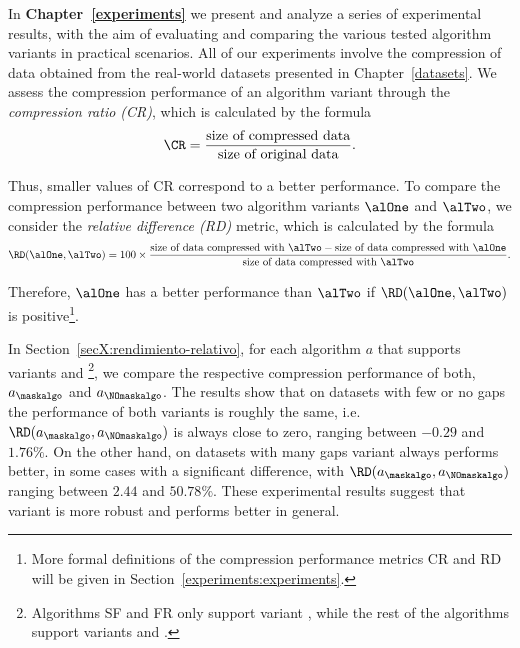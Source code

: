 In \textbf{Chapter~\ref{experiments}} we present and analyze a series of experimental results, with the aim of evaluating and comparing the various tested algorithm variants in practical scenarios. All of our experiments involve the compression of data obtained from the real-world datasets presented in Chapter~\ref{datasets}. We assess the compression performance of an algorithm variant through the \textit{compression ratio (CR)}, which is calculated by the formula
\vspace{-2pt}
\begin{equation}
\CR = \frac{\textnormal{size of compressed data}}{\textnormal{size of original data}}.
\end{equation}


\clearpage


\newcommand{\footCRRD}{\footnote{More formal definitions of the compression performance metrics CR and RD will be given in Section~\ref{experiments:experiments}.}}

Thus, smaller values of CR correspond to a better performance. To compare the compression performance between two algorithm variants $\alOne$ and $\alTwo$, we consider the \textit{relative difference (RD)} metric, which is calculated by the formula
\vspace{-2pt}
\newcommand{\sizeofd}{\textnormal{size of data compressed with }}
\begin{equation}
\RD(\alOne, \alTwo) = 100\times\frac{\sizeofd \alTwo - \sizeofd \alOne}{\sizeofd \alTwo}.
\end{equation}

\vspace{-2pt}
Therefore, $\alOne$ has a better performance than $\alTwo$ if $\RD(\alOne, \alTwo)$ is positive\footCRRD.


\newcommand{\footSupportBoth}{\footnote{Algorithms SF and FR only support variant \maskalgo, while the rest of the algorithms support variants \maskalgo and \NOmaskalgo.}}


In Section~\ref{secX:rendimiento-relativo}, for each algorithm $a$ that supports variants \maskalgo and \NOmaskalgo\footSupportBoth, we compare the respective compression performance of both, $a_\maskalgo$ and $a_\NOmaskalgo$. The results show that on datasets with few or no gaps the performance of both variants is roughly the same, i.e. $\RD(a_\maskalgo, a_\NOmaskalgo)$ is always close to zero, ranging between $-0.29$ and $1.76\%$. On the other hand, on datasets with many gaps variant \maskalgo always performs better, in some cases with a significant difference, with $\RD(a_\maskalgo, a_\NOmaskalgo)$ ranging between $2.44$ and $50.78\%$. These experimental results suggest that variant \maskalgo is more robust and performs better in general.


